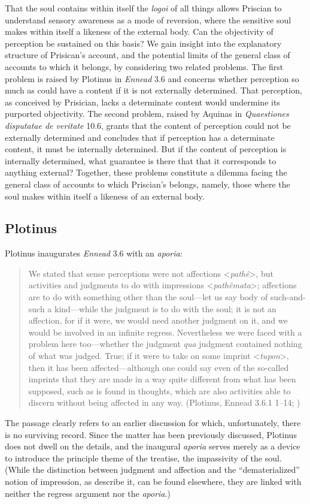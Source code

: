 \documentclass[12pt]{article}
\begin{document}
That the soul contains within itself the \emph{logoi} of all things allows Priscian to understand sensory awareness as a mode of reversion, where the sensitive soul makes within itself a likeness of the external body. Can the objectivity of perception be sustained on this basis? We gain insight into the explanatory structure of Prisican's account, and the potential limits of the general class of accounts to which it belongs, by considering two related problems. The first problem is raised by Plotinus in \emph{Ennead} 3.6 and concerns whether perception so much as could have a content if it is not externally determined. That perception, as conceived by Prisician, lacks a determinate content would undermine its purported objectivity. The second problem, raised by Aquinas in \emph{Quaestiones disputatae de veritate} 10.6, grants that the content of perception could not be externally determined and concludes that if perception has a determinate content, it must be internally determined. But if the content of perception is internally determined, what guarantee is there that that it corresponds to anything external? Together, these problems constitute a dilemma facing the general class of accounts to which Priscian's belongs, namely, those where the soul makes within itself a likeness of an external body.

\subsection{Plotinus} %
\label{sub:plotinus}

Plotinus inaugurates \emph{Ennead} 3.6 with an \emph{aporia}:
\begin{quote}
	We stated that sense perceptions were not affections <\emph{pathê}>, but activities and judgments to do with impressions <\emph{pathêmata}>; affections are to do with something other than the soul---let us say body of such-and-such a kind---while the judgment is to do with the soul; it is not an affection, for if it were, we would need another judgment on it, and we would be involved in an infinite regress. Nevertheless we were faced with a problem here too---whether the judgment \emph{qua} judgment contained nothing of what was judged. True; if it were to take on some imprint <\emph{tupon}>, then it has been affected---although one could say even of the so-called imprints that they are made in a way quite different from what has been supposed, such as is found in thoughts, which are also activities able to discern without being affected in any way. (Plotinus, Ennead 3.6.1 1--14; \citealt[3]{Fleet:1995gf})
\end{quote}
The passage clearly refers to an earlier discussion for which, unfortunately, there is no surviving record. Since the matter has been previously discussed, Plotinus does not dwell on the details, and the inaugural \emph{aporia} serves merely as a device to introduce the principle theme of the treatise, the impassivity of the soul. (While the distinction between judgment and affection and the ``dematerialized'' notion of impression, as \citealt[292]{Dillon:2015yf} describe it, can be found elsewhere, they are linked with neither the regress argument nor the \emph{aporia}.) 
\end{document}
